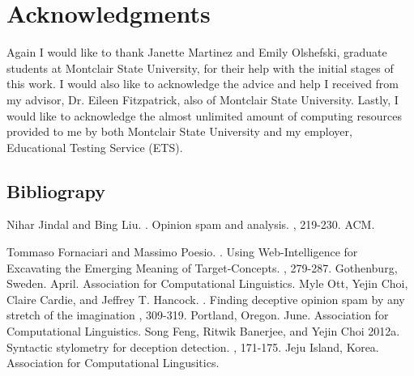 \documentclass[9pt]{article}
\begin{document}
\section*{Acknowledgments}

Again I would like to thank Janette Martinez and Emily Olshefski, graduate students at Montclair State University, for their help with the initial stages of this work. I would also like to acknowledge the advice and help I received from my advisor, Dr. Eileen Fitzpatrick, also of Montclair State University. Lastly, I would like to acknowledge the almost unlimited amount of computing resources provided to me by both Montclair State University and my employer, Educational Testing Service (ETS).

\begin{thebibliography}{}

\section*{Bibliograpy}
Nihar Jindal and Bing Liu.
.
\newblock Opinion spam and analysis. 
, 219-230. ACM.

Tommaso Fornaciari and Massimo Poesio.
.
\newblock Using Web-Intelligence for Excavating the
    Emerging Meaning of Target-Concepts.
, 279-287. Gothenburg, Sweden. April. Association for Computational Linguistics.
Myle Ott, Yejin Choi, Claire Cardie, and Jeffrey T. Hancock.
.
\newblock  Finding deceptive opinion spam by any stretch of the imagination
, 309-319. Portland, Oregon. June. Association for Computational Linguistics.
Song Feng, Ritwik Banerjee, and Yejin Choi
\newblock 2012a.
\newblock Syntactic stylometry for deception detection.
, 171-175. Jeju Island, Korea. Association for Computational Lingusitics.

\end{thebibliography}
\end{document}
